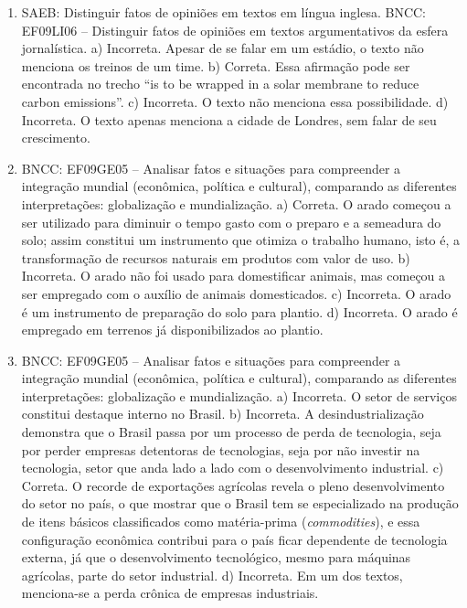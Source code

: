\begin{enumerate}
\item
SAEB: Distinguir fatos de opiniões em textos em língua inglesa. BNCC:
EF09LI06 -- Distinguir fatos de opiniões em textos argumentativos da
esfera jornalística.
a) Incorreta. Apesar de se falar em um estádio, o texto não menciona os
treinos de um time. b) Correta. Essa afirmação pode ser encontrada no
trecho ``is to be wrapped in a solar membrane to reduce carbon
emissions''. c) Incorreta. O texto não menciona essa possibilidade. d)
Incorreta. O texto apenas menciona a cidade de Londres, sem falar de seu
crescimento.

\item
BNCC: EF09GE05 -- Analisar fatos e situações para compreender a
integração mundial (econômica, política e cultural), comparando as
diferentes interpretações: globalização e mundialização.
a) Correta. O arado começou a ser utilizado para diminuir o tempo gasto com o preparo e a semeadura do solo; assim  constitui um instrumento que
otimiza o trabalho humano, isto é, a transformação de recursos naturais
em produtos com valor de uso. b) Incorreta. O arado não foi usado para domestificar animais, mas começou a ser empregado com o auxílio de animais domesticados.
c) Incorreta. O arado é um instrumento de preparação do solo para plantio.
d) Incorreta. O arado é empregado em terrenos já disponibilizados ao
plantio.

\item
BNCC: EF09GE05 -- Analisar fatos e situações para compreender a
integração mundial (econômica, política e cultural), comparando as
diferentes interpretações: globalização e mundialização.
a) Incorreta. O setor de serviços constitui destaque interno no Brasil.
b) Incorreta. A desindustrialização demonstra que o Brasil passa por um
  processo de perda de tecnologia, seja por perder empresas detentoras
  de tecnologias, seja por não investir na tecnologia, setor que anda
  lado a lado com o desenvolvimento industrial.
c) Correta. O recorde de exportações agrícolas revela o pleno
  desenvolvimento do setor no país, o que mostrar que o Brasil tem se
  especializado na produção de itens básicos classificados como
  matéria-prima (\textit{commodities}), e essa configuração econômica
  contribui para o país ficar dependente de tecnologia externa, já que o
  desenvolvimento tecnológico, mesmo para máquinas agrícolas, parte do
  setor industrial.
d) Incorreta. Em um dos textos, menciona-se a perda crônica de empresas
  industriais.


\end{enumerate}
